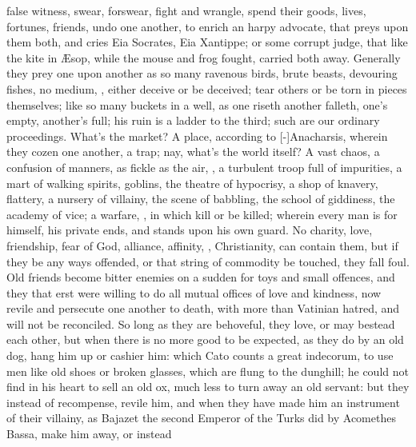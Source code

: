 {false witness, swear, forswear, fight and wrangle, spend their goods,
lives, fortunes, friends, undo one another, to enrich an harpy
advocate, that preys upon them both, and cries Eia Socrates, Eia
Xantippe; or some corrupt judge, that like the kite in \AE{}sop,
while the mouse and frog fought, carried both away. Generally they prey
one upon another as so many ravenous birds, brute beasts, devouring
fishes, no medium, , either deceive or be
deceived; tear others or be torn in pieces themselves; like so many
buckets in a well, as one riseth another falleth, one's empty,
another's full; his ruin is a ladder to the third; such are our
ordinary proceedings. What's the market? A place, according to
[-\baselineskip]Anacharsis, wherein they cozen one another, a trap; nay, what's
the world itself? A vast chaos, a confusion of manners, as fickle
as the air, , a turbulent troop full of impurities,
a mart of walking spirits, goblins, the theatre of hypocrisy, a shop of
knavery, flattery, a nursery of villainy, the scene of babbling, the
school of giddiness, the academy of vice; a warfare, , in which kill or be killed;
wherein every man is for himself, his private ends, and stands upon his
own guard. No charity, love, friendship, fear of God, alliance,
affinity, , Christianity, can contain them, but if they be
any ways offended, or that string of commodity be touched, they fall
foul. Old friends become bitter enemies on a sudden for toys and small
offences, and they that erst were willing to do all mutual offices of
love and kindness, now revile and persecute one another to death, with
more than Vatinian hatred, and will not be reconciled. So long as they
are behoveful, they love, or may bestead each other, but when there is
no more good to be expected, as they do by an old dog, hang him up or
cashier him: which  Cato counts a great indecorum, to use men like
old shoes or broken glasses, which are flung to the dunghill; he could
not find in his heart to sell an old ox, much less to turn away an old
servant: but they instead of recompense, revile him, and when they have
made him an instrument of their villainy, as Bajazet the second
Emperor of the Turks did by Acomethes Bassa, make him away, or instead
}
